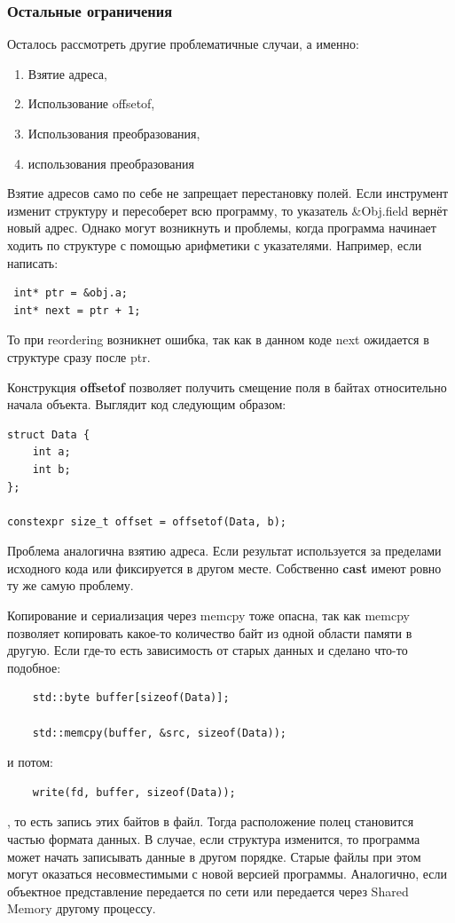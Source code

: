 \documentclass[a4paper,12pt]{article}
\begin{document}
\subsubsection{Остальные ограничения}
Осталось рассмотреть другие проблематичные случаи, а именно:
\begin{enumerate}
    \item Взятие адреса,
    \item Использование offsetof,
    \item Использования преобразования,
    \item использования преобразования
\end{enumerate}

Взятие адресов само по себе не запрещает перестановку полей. Если инструмент
изменит структуру и пересоберет всю программу, то указатель \&Obj.field вернёт
новый адрес. Однако могут возникнуть и проблемы, когда программа начинает ходить
по структуре с помощью арифметики с указателями. Например, если написать:
\begin{lstlisting}
 int* ptr = &obj.a;
 int* next = ptr + 1;
\end{lstlisting}

То при reordering возникнет ошибка, так как в данном коде next ожидается в
структуре сразу после ptr. 

\hrulefill

Конструкция \textbf{offsetof} позволяет получить смещение поля в
байтах относительно начала объекта. Выглядит код следующим образом:
\begin{lstlisting}
struct Data {
    int a;
    int b;
};

constexpr size_t offset = offsetof(Data, b);
\end{lstlisting}


Проблема аналогична взятию адреса. Если результат используется за пределами
исходного кода или фиксируется в другом месте. Собственно \textbf{cast} имеют
ровно ту же самую проблему. 

Копирование и сериализация через memcpy тоже опасна, так как memcpy позволяет
копировать какое-то количество байт из одной области памяти в другую. Если
где-то есть зависимость от старых данных и сделано что-то подобное:
\begin{lstlisting}
    std::byte buffer[sizeof(Data)];

    std::memcpy(buffer, &src, sizeof(Data));
\end{lstlisting}

и потом:
\begin{lstlisting}
    write(fd, buffer, sizeof(Data));
\end{lstlisting}, 
то есть запись этих байтов в файл. Тогда расположение полец становится частью
формата данных. В случае, если структура изменится, то программа может начать
записывать данные в другом порядке. Старые файлы при этом могут оказаться
несовместимыми с новой версией программы. Аналогично, если объектное
представление передается по сети или передается через Shared Memory другому процессу. 
\end{document}
